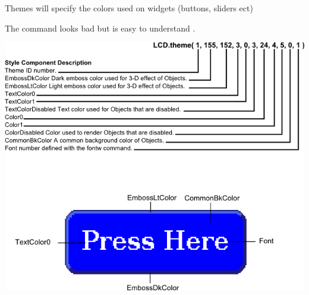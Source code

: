 Themes will specify the colors used on widgets (buttons, sliders ect)\par
 The command looks bad but is easy to understand .\par
  
\begin{DoxyImageNoCaption}
  \mbox{\includegraphics{themes.png}}
\end{DoxyImageNoCaption}
 